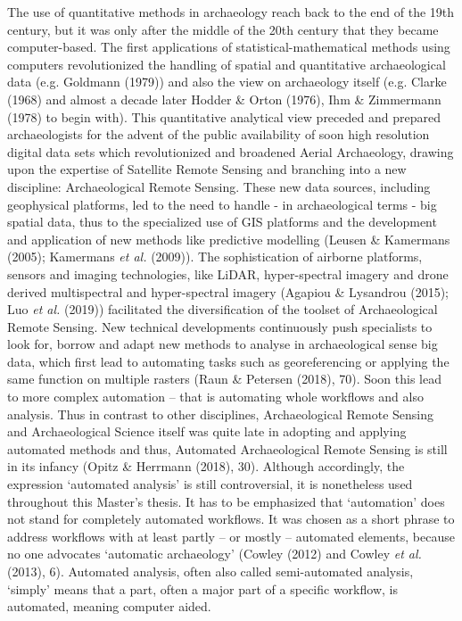 \documentclass[
  12pt,
]{article}
\begin{document}
The use of quantitative methods in archaeology reach back to the end of the 19th century, but it was only after the middle of the 20th century that they became computer-based. The first applications of statistical-mathematical methods using computers revolutionized the handling of spatial and quantitative archaeological data (e.g. Goldmann (1979)) and also the view on archaeology itself (e.g. Clarke (1968) and almost a decade later Hodder \& Orton (1976), Ihm \& Zimmermann (1978) to begin with). This quantitative analytical view preceded and prepared archaeologists for the advent of the public availability of soon high resolution digital data sets which revolutionized and broadened Aerial Archaeology, drawing upon the expertise of Satellite Remote Sensing and branching into a new discipline: Archaeological Remote Sensing. These new data sources, including geophysical platforms, led to the need to handle - in archaeological terms - big spatial data, thus to the specialized use of GIS platforms and the development and application of new methods like predictive modelling (Leusen \& Kamermans (2005); Kamermans \emph{et al.} (2009)). The sophistication of airborne platforms, sensors and imaging technologies, like LiDAR, hyper-spectral imagery and drone derived multispectral and hyper-spectral imagery (Agapiou \& Lysandrou (2015); Luo \emph{et al.} (2019)) facilitated the diversification of the toolset of Archaeological Remote Sensing.
New technical developments continuously push specialists to look for, borrow and adapt new methods to analyse in archaeological sense big data, which first lead to automating tasks such as georeferencing or applying the same function on multiple rasters (Raun \& Petersen (2018), 70). Soon this lead to more complex automation -- that is automating whole workflows and also analysis.
Thus in contrast to other disciplines, Archaeological Remote Sensing and Archaeological Science itself was quite late in adopting and applying automated methods and thus, Automated Archaeological Remote Sensing is still in its infancy (Opitz \& Herrmann (2018), 30). Although accordingly, the expression `automated analysis' is still controversial, it is nonetheless used throughout this Master's thesis. It has to be emphasized that `automation' does not stand for completely automated workflows. It was chosen as a short phrase to address workflows with at least partly -- or mostly -- automated elements, because no one advocates `automatic archaeology' (Cowley (2012) and Cowley \emph{et al.} (2013), 6). Automated analysis, often also called semi-automated analysis, `simply' means that a part, often a major part of a specific workflow, is automated, meaning computer aided.
\end{document}
